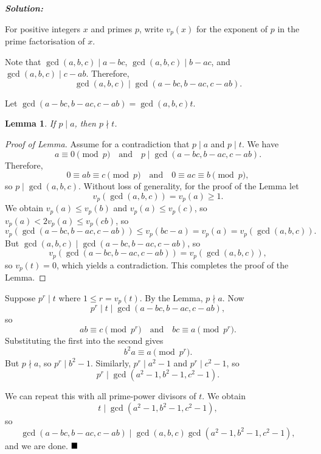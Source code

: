 \documentclass[12pt]{article}
\newtheorem{lemma}{Lemma}
\newcommand{\sol}{\textbf{\textit{Solution: }}}
\begin{document}
\begin{enumerate}[topsep=2\bigskipamount,itemsep=\bigskipamount]
\sol

\newcommand{\gcdabc}{\gcd(a,b,c)}
\newcommand{\gcdabMinc}{\gcd(a-bc,b-ac,c-ab)}

For positive integers $x$ and primes $p$, write $v_p(x)$ for the exponent of $p$ in the prime factorisation of $x$.

Note that $\gcd(a,b,c) \mid a - bc$, $\gcd(a,b,c) \mid b - ac$, and $\gcd(a,b,c) \mid c - ab$.
Therefore,
$$\gcd(a, b, c) \mid \gcd(a - bc, b - ac, c - ab).$$

Let $\gcd(a - bc, b - ac, c - ab) = \gcd(a, b, c)t$.

\begin{lemma}
    If $p \mid a$, then $p \nmid t$.
\end{lemma}
\begin{proof}[Proof of Lemma]
Assume for a contradiction that $p \mid a$ and $p \mid t$. We have
\[a \equiv 0 \pmod{p} \quad\text{and}\quad p \mid \gcdabMinc.\]
Therefore,
\[0 \equiv ab \equiv c \pmod{p} \quad\text{and}\quad 0 \equiv ac \equiv b \pmod{p},\]
so $p \mid \gcdabc$.
Without loss of generality, for the proof of the Lemma let
\[ v_p(\gcdabc) = v_p(a) \geqslant 1. \]
We obtain $v_p(a) \leqslant v_p(b)$ and $v_p(a) \leqslant v_p(c)$, so $v_p(a) < 2v_p(a) \leqslant v_p(cb)$, so
$$v_p(\gcdabMinc) \leqslant v_p(bc-a) = v_p(a) = v_p(\gcdabc).$$
But \(\gcdabc \mid \gcdabMinc\), so
\[v_p(\gcdabMinc) = v_p(\gcdabc),\]
so $v_p(t) = 0$, which yields a contradiction.
This completes the proof of the Lemma.
\end{proof}

Suppose $p^{r} \mid t$ where $1 \leqslant r = v_p(t)$.
By the Lemma, $p \nmid a$.
Now
$$p^r \mid t \mid \gcdabMinc,$$
so
$$ab\equiv c \pmod{p^r} \quad\text{and}\quad bc\equiv a \pmod{p^r}.$$
Substituting the first into the second gives
$$b^2 a\equiv a \pmod{p^r}.$$
But $p \nmid a$, so $p^r \mid b^2-1$. Similarly, $p^r \mid a^2-1$ and $p^r \mid c^2-1$, so
$$p^r \mid \gcd(a^2-1,b^2-1,c^2-1).$$

We can repeat this with all prime-power divisors of $t$. We obtain
$$t \mid \gcd(a^2-1,b^2-1,c^2-1),$$
so
$$\gcd(a-bc,b-ac,c-ab) \mid \gcd(a,b,c)\gcd(a^2-1,b^2-1,c^2-1),$$
and we are done. $\hfill\blacksquare$
\end{enumerate}
\end{document}
